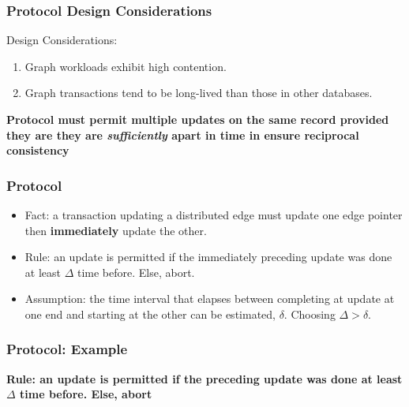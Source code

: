 \begin{frame}
  \frametitle{Protocol Design Considerations}
  Design Considerations:
  \begin{enumerate}
  \item Graph workloads exhibit high contention.
  \item Graph transactions tend to be long-lived than those in other databases.
  \end{enumerate}
\textbf{Protocol must permit multiple updates on the same record provided they are they are \textit{sufficiently} apart in time in ensure reciprocal consistency}
\end{frame}

\begin{frame}
  \frametitle{\tDelta Protocol}
  \begin{itemize}
  \item Fact: a transaction updating a distributed edge must update one edge pointer then \textbf{immediately} update the other.
  \item Rule: an update is permitted if the immediately preceding update was done at least $\Delta$ time before. Else, abort.
  \item Assumption: the time interval that elapses between completing at update at one end and starting at the other can be estimated, $\delta$. Choosing $\Delta > \delta$.
  \end{itemize}
\end{frame}

\begin{frame}
  \frametitle{\tDelta Protocol: Example}
  \begin{center}
    \textbf{\small{Rule: an update is permitted if the preceding update was done at least $\Delta$ time before. Else, abort}}
  \end{center}
  \begin{figure}[h!]
    \centering
  \end{figure}
\end{frame}

